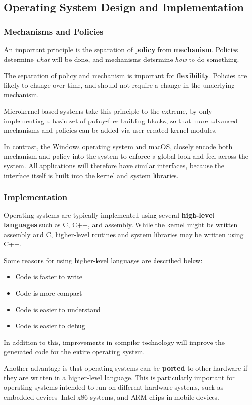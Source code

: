 \documentclass{article}
\begin{document}
\subsection{Operating System Design and Implementation}
\subsubsection{Mechanisms and Policies}
An important principle is the separation of \textbf{policy} from
\textbf{mechanism}. Policies determine \textit{what} will be done, and
mechanisms determine \textit{how} to do something.

The separation of policy and mechanism is important for
\textbf{flexibility}. Policies are likely to change over time, and
should not require a change in the underlying mechanism.

Microkernel based systems take this principle to the extreme, by only
implementing a basic set of policy-free building blocks, so that more
advanced mechanisms and policies can be added via user-created kernel
modules.

In contrast, the Windows operating system and macOS, closely encode
both mechanism and policy into the system to enforce a global look and
feel across the system. All applications will therefore have similar
interfaces, because the interface itself is built into the kernel and
system libraries.
\subsubsection{Implementation}
Operating systems are typically implemented using several
\textbf{high-level languages} such as C, C++, and assembly. While the
kernel might be written assembly and C, higher-level routines and
system libraries may be written using C++.

Some reasons for using higher-level languages are described below:
\begin{itemize}
    \item Code is faster to write
    \item Code is more compact
    \item Code is easier to understand
    \item Code is easier to debug
\end{itemize}
In addition to this,
improvements in compiler technology will improve the
generated code for the entire operating system.

Another advantage is that operating systems can be \textbf{ported} to
other hardware if they are written in a higher-level language. This is
particularly important for operating systems intended to run on
different hardware systems, such as embedded devices, Intel x86
systems, and ARM chips in mobile devices.
\end{document}
